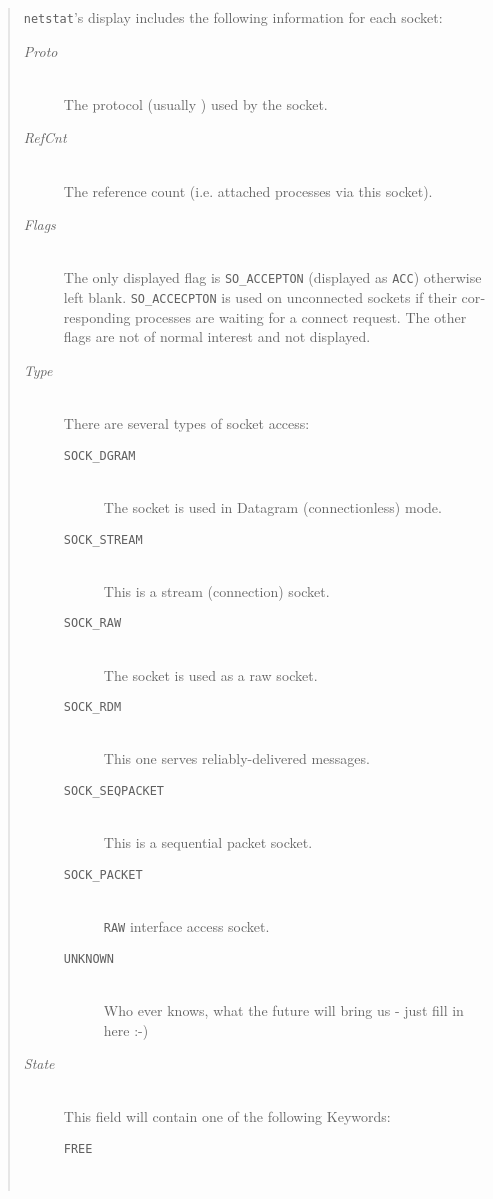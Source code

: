 \begin{appendix}
\begin{english}
\begin{quote}
	{\tt netstat}'s display includes the following information for each
	socket:
	\begin{description}
		\item[{\sl Proto}]\mbox{}\\
			The protocol (usually {\Unix}) used by the socket.
		\item[{\sl RefCnt}]\mbox{}\\
			The reference count (i.e. attached processes via this
			socket).
		\item[{\sl Flags}]\mbox{}\\
			The only displayed flag is {\tt SO\_ACCEPTON} (displayed as {\tt ACC})
			otherwise left blank. {\tt SO\_ACCECPTON} is used on unconnected
			sockets if their corresponding processes are waiting for a
			connect request. The other flags are not of normal interest and
			not displayed.
		\item[{\sl Type}]\mbox{}\\
			There are several types of socket access:
			\begin{description}
				\item[{\tt SOCK\_DGRAM}]\mbox{}\\
					The socket is used in Datagram (connectionless)
					mode.
				\item[{\tt SOCK\_STREAM}]\mbox{}\\
					This is a stream (connection) socket.
				\item[{\tt SOCK\_RAW}]\mbox{}\\
					The socket is used as a raw socket.
				\item[{\tt SOCK\_RDM}]\mbox{}\\
					This one serves reliably-delivered messages.
				\item[{\tt SOCK\_SEQPACKET}]\mbox{}\\
					This is a sequential packet socket.
				\item[{\tt SOCK\_PACKET}]\mbox{}\\
					{\tt RAW} interface access socket.
				\item[{\tt UNKNOWN}]\mbox{}\\
					Who ever knows, what the future will bring us -
					just fill in here :-)
			\end{description}
		\item[{\sl State}]\mbox{}\\
			This field will contain one of the following Keywords:
			\begin{description}
				\item[{\tt FREE}]\mbox{}\\

\end{description}
\end{description}
\end{quote}
\end{english}
\end{appendix}
